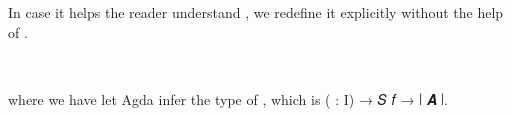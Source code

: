 \ccpad
In case it helps the reader understand , we redefine it explicitly without the help of
. %
\ccpad
\begin{code}%
\>[1]\AgdaSpace{}%
\AgdaSymbol{:}\AgdaSpace{}%
\AgdaSpace{}%
\AgdaSpace{}%
\AgdaSpace{}%
\AgdaSpace{}%
\AgdaSpace{}%
\AgdaSpace{}%
\AgdaSpace{}%
\AgdaSpace{}%
\AgdaSpace{}%
\AgdaSpace{}%
\AgdaSpace{}%
\AgdaSpace{}%
\AgdaSpace{}%
\AgdaSpace{}%
\AgdaSpace{}%
\AgdaSpace{}%
\<%
\\
%
\>[1]\AgdaSpace{}%
\AgdaSpace{}%
\AgdaSpace{}%
\AgdaSymbol{=}\AgdaSpace{}%
\AgdaSpace{}%
\AgdaSpace{}%
\AgdaSpace{}%
\AgdaSymbol{(}\AgdaSpace{}%
\AgdaSymbol{)}\AgdaSpace{}%
\AgdaSpace{}%
\AgdaSpace{}%
\AgdaSpace{}%
\AgdaSpace{}%
\AgdaSpace{}%
\AgdaSpace{}%
\AgdaSymbol{(}\AgdaSpace{}%
\AgdaSpace{}%
\AgdaSymbol{)}\AgdaSpace{}%
\AgdaSymbol{(}\AgdaSpace{}%
\AgdaSymbol{))}\<%
\end{code}
\ccpad
where we have let Agda infer the type of , which is ( \as : \ab I) \as →  \ab 𝑆  \ab 𝑓 \as → \af ∣ \ab 𝑨 \af ∣.

